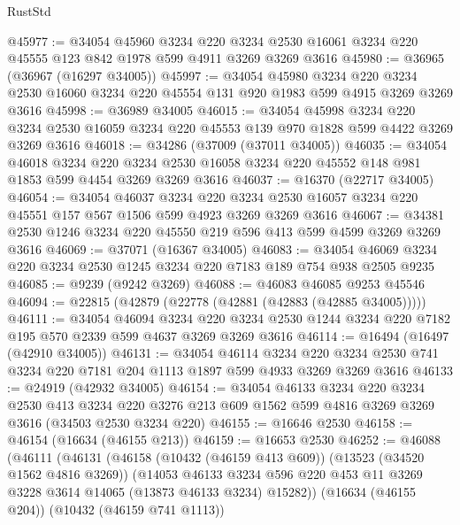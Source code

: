 \begin{lexlean}{RustStd}
\begin{coremodule}
@45977 := @34054
    @45960
    @3234
    @220
    @3234
    @2530
    @16061
    @3234
    @220
    @45555
    @123
    @842
    @1978
    @599
    @4911
    @3269
    @3269
    @3616
@45980 := @36965 (@36967 (@16297 @34005))
@45997 := @34054
    @45980
    @3234
    @220
    @3234
    @2530
    @16060
    @3234
    @220
    @45554
    @131
    @920
    @1983
    @599
    @4915
    @3269
    @3269
    @3616
@45998 := @36989 @34005
@46015 := @34054
    @45998
    @3234
    @220
    @3234
    @2530
    @16059
    @3234
    @220
    @45553
    @139
    @970
    @1828
    @599
    @4422
    @3269
    @3269
    @3616
@46018 := @34286 (@37009 (@37011 @34005))
@46035 := @34054
    @46018
    @3234
    @220
    @3234
    @2530
    @16058
    @3234
    @220
    @45552
    @148
    @981
    @1853
    @599
    @4454
    @3269
    @3269
    @3616
@46037 := @16370 (@22717 @34005)
@46054 := @34054
    @46037
    @3234
    @220
    @3234
    @2530
    @16057
    @3234
    @220
    @45551
    @157
    @567
    @1506
    @599
    @4923
    @3269
    @3269
    @3616
@46067 := @34381 @2530 @1246 @3234 @220 @45550 @219 @596 @413 @599 @4599 @3269 @3269 @3616
@46069 := @37071 (@16367 @34005)
@46083 := @34054 @46069 @3234 @220 @3234 @2530 @1245 @3234 @220 @7183 @189 @754 @938 @2505 @9235
@46085 := @9239 (@9242 @3269)
@46088 := @46083 @46085 @9253 @45546
@46094 := @22815 (@42879 (@22778 (@42881 (@42883 (@42885 @34005)))))
@46111 := @34054
    @46094
    @3234
    @220
    @3234
    @2530
    @1244
    @3234
    @220
    @7182
    @195
    @570
    @2339
    @599
    @4637
    @3269
    @3269
    @3616
@46114 := @16494 (@16497 (@42910 @34005))
@46131 := @34054
    @46114
    @3234
    @220
    @3234
    @2530
    @741
    @3234
    @220
    @7181
    @204
    @1113
    @1897
    @599
    @4933
    @3269
    @3269
    @3616
@46133 := @24919 (@42932 @34005)
@46154 := @34054
    @46133
    @3234
    @220
    @3234
    @2530
    @413
    @3234
    @220
    @3276
    @213
    @609
    @1562
    @599
    @4816
    @3269
    @3269
    @3616
    (@34503 @2530 @3234 @220)
@46155 := @16646 @2530
@46158 := @46154 (@16634 (@46155 @213))
@46159 := @16653 @2530
@46252 := @46088
    (@46111
      (@46131
        (@46158
          (@10432 (@46159 @413 @609))
          (@13523 (@34520 @1562 @4816 @3269))
          (@14053
            @46133
            @3234
            @596
            @220
            @453
            @11
            @3269
            @3228
            @3614
            @14065
            (@13873 @46133 @3234)
            @15282))
        (@16634 (@46155 @204))
        (@10432 (@46159 @741 @1113))

\end{coremodule}
\end{lexlean}
